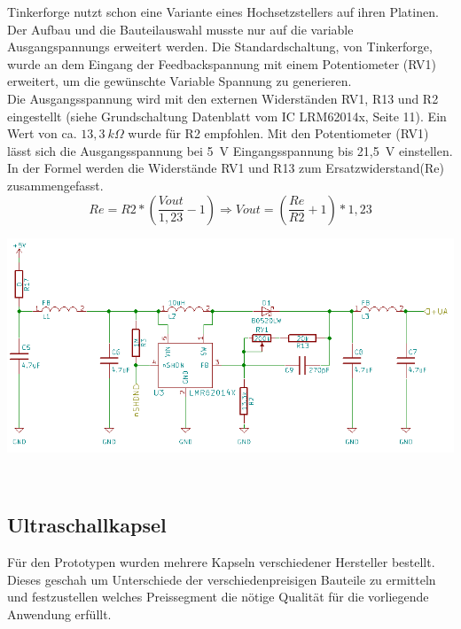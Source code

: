 Tinkerforge nutzt schon eine Variante eines Hochsetzstellers auf ihren Platinen. Der Aufbau und die Bauteilauswahl musste nur auf die variable Ausgangspannungs erweitert werden. Die Standardschaltung, von Tinkerforge, wurde an dem Eingang der Feedbackspannung mit einem Potentiometer (RV1) erweitert, um die gewünschte Variable Spannung zu generieren.\\
Die Ausgangsspannung wird mit den externen Widerständen RV1, R13 und R2 eingestellt (siehe Grundschaltung Datenblatt vom IC LRM62014x, Seite 11). Ein Wert von ca. \(\displaystyle 13,3~k\Omega \) wurde für R2 empfohlen. Mit den Potentiometer (RV1) lässt sich die Ausgangsspannung bei 5~V Eingangsspannung bis 21,5~V einstellen. In der Formel werden die Widerstände RV1 und R13 zum Ersatzwiderstand(Re) zusammengefasst.
\onehalfspacing \\
\[\displaystyle Re=R2*\left(\frac{Vout}{1,23}-1\right) \Rightarrow Vout=\left(\frac{Re}{R2}+1\right)*1,23\] 
\singlespacing
\begin{center}
\begin{minipage}{1\textwidth}
\includegraphics[width=1\textwidth%
]{Abbildungen/Pumpe.png}
\label{fig:Hochsetzsteller}
\end{minipage}\\
\end{center}

\subsection{Ultraschallkapsel}%
Für den Prototypen wurden mehrere Kapseln verschiedener Hersteller bestellt. Dieses geschah um Unterschiede der verschiedenpreisigen Bauteile zu ermitteln und festzustellen welches Preissegment die nötige Qualität für die vorliegende Anwendung erfüllt.


